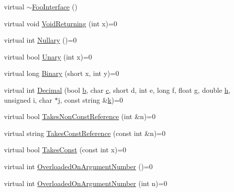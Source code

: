 \begin{DoxyCompactItemize}
\item 
virtual \hyperlink{classtesting_1_1gmock__generated__function__mockers__test_1_1_foo_interface_ad4eb4709c9ae9b1cdaded8d05567cdbb}{$\sim$\+Foo\+Interface} ()
\item 
virtual void \hyperlink{classtesting_1_1gmock__generated__function__mockers__test_1_1_foo_interface_adf968115cf1260004d8abe372dc71c85}{Void\+Returning} (int x)=0
\item 
virtual int \hyperlink{classtesting_1_1gmock__generated__function__mockers__test_1_1_foo_interface_a633e753eafa7f82dde22ecf9492f341c}{Nullary} ()=0
\item 
virtual bool \hyperlink{classtesting_1_1gmock__generated__function__mockers__test_1_1_foo_interface_ae0885ac29bc4a3f180f6573d8b1a341e}{Unary} (int x)=0
\item 
virtual long \hyperlink{classtesting_1_1gmock__generated__function__mockers__test_1_1_foo_interface_a59ea28b711ece054ce9d57c2dc574ba0}{Binary} (short x, int y)=0
\item 
virtual int \hyperlink{classtesting_1_1gmock__generated__function__mockers__test_1_1_foo_interface_a5c5886880581d8dd420c9a187ff884b2}{Decimal} (bool \hyperlink{jquery_8js_a2fa551895933fae935a0a6b87282241d}{b}, char \hyperlink{jquery_8js_abce695e0af988ece0826d9ad59b8160d}{c}, short d, int e, long f, float g, double \hyperlink{defines__3_8js_ae2a90576a00c74b62070401964c54a5d}{h}, unsigned i, char $\ast$j, const string \&\hyperlink{jquery_8js_ab26645c014aa005ecedef329ecf58c99}{k})=0
\item 
virtual bool \hyperlink{classtesting_1_1gmock__generated__function__mockers__test_1_1_foo_interface_a694354adfffcee58093298bc12182ff5}{Takes\+Non\+Const\+Reference} (int \&n)=0
\item 
virtual string \hyperlink{classtesting_1_1gmock__generated__function__mockers__test_1_1_foo_interface_a3db03c9698ecddfc62f2a1ed2f3c32c2}{Takes\+Const\+Reference} (const int \&n)=0
\item 
virtual bool \hyperlink{classtesting_1_1gmock__generated__function__mockers__test_1_1_foo_interface_a8c53e87edf0b9da878e5259f02b7f5dc}{Takes\+Const} (const int x)=0
\item 
virtual int \hyperlink{classtesting_1_1gmock__generated__function__mockers__test_1_1_foo_interface_ae9e86ac64fa9acedfb1fa747174c7f43}{Overloaded\+On\+Argument\+Number} ()=0
\item 
virtual int \hyperlink{classtesting_1_1gmock__generated__function__mockers__test_1_1_foo_interface_a1b5ff8cc745af475e0abba5d2858e1c9}{Overloaded\+On\+Argument\+Number} (int n)=0

\end{DoxyCompactItemize}
